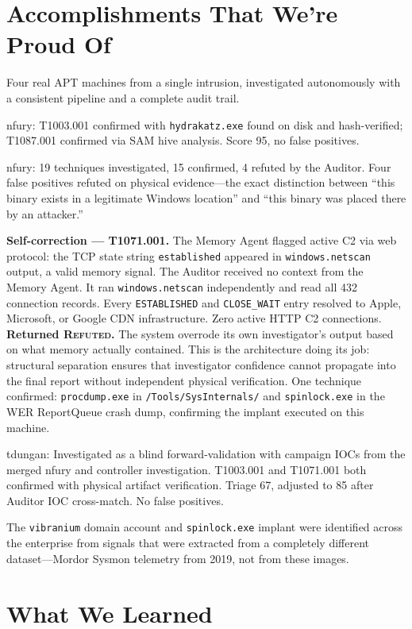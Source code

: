 \documentclass[10pt, letterpaper]{article}
\begin{document}
\section{Accomplishments That We're Proud Of}

Four real APT machines from a single intrusion, investigated
autonomously with a consistent pipeline and a complete audit trail.

nfury: T1003.001 confirmed with \texttt{hydrakatz.exe} found on disk and
hash-verified; T1087.001 confirmed via SAM hive analysis. Score 95, no
false positives.

nfury: 19 techniques investigated, 15 confirmed, 4 refuted by the Auditor. Four
false positives refuted on physical evidence---the exact distinction between
``this binary exists in a legitimate Windows location'' and ``this binary
was placed there by an attacker.''

\textbf{Self-correction --- T1071.001.} The Memory Agent flagged active C2
via web protocol: the TCP state string \texttt{established} appeared in
\texttt{windows.netscan} output, a valid memory signal. The Auditor received
no context from the Memory Agent. It ran \texttt{windows.netscan}
independently and read all 432 connection records. Every \texttt{ESTABLISHED}
and \texttt{CLOSE\_WAIT} entry resolved to Apple, Microsoft, or Google CDN
infrastructure. Zero active HTTP C2 connections. \textbf{Returned
\textsc{Refuted}.} The system overrode its own investigator's output based
on what memory actually contained. This is the architecture doing its job:
structural separation ensures that investigator confidence cannot propagate
into the final report without independent physical verification. One technique confirmed:
\texttt{procdump.exe} in \texttt{/Tools/SysInternals/} and
\texttt{spinlock.exe} in the WER ReportQueue crash dump, confirming the
implant executed on this machine.

tdungan: Investigated as a blind forward-validation with campaign IOCs
from the merged nfury and controller investigation. T1003.001 and
T1071.001 both confirmed with physical artifact verification. Triage 67,
adjusted to 85 after Auditor IOC cross-match. No false positives.

The \texttt{vibranium} domain account and \texttt{spinlock.exe} implant
were identified across the enterprise from signals that were extracted
from a completely different dataset---Mordor Sysmon telemetry from 2019,
not from these images.

\section{What We Learned}
\end{document}
